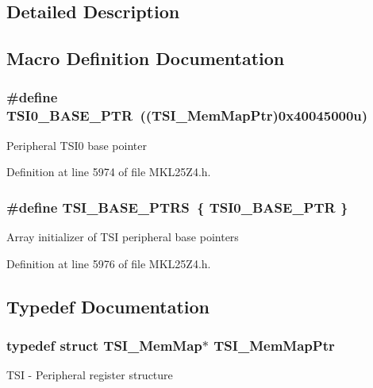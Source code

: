 \subsection{Detailed Description}


\subsection{Macro Definition Documentation}
\subsubsection[{\texorpdfstring{T\+S\+I0\+\_\+\+B\+A\+S\+E\+\_\+\+P\+TR}{TSI0_BASE_PTR}}]{\setlength{\rightskip}{0pt plus 5cm}\#define T\+S\+I0\+\_\+\+B\+A\+S\+E\+\_\+\+P\+TR~(({\bf T\+S\+I\+\_\+\+Mem\+Map\+Ptr})0x40045000u)}\hypertarget{group___t_s_i___peripheral_gaf98ea1cd15559446e0cfc1ae177751f6}{}\label{group___t_s_i___peripheral_gaf98ea1cd15559446e0cfc1ae177751f6}
Peripheral T\+S\+I0 base pointer 

Definition at line 5974 of file M\+K\+L25\+Z4.\+h.

\subsubsection[{\texorpdfstring{T\+S\+I\+\_\+\+B\+A\+S\+E\+\_\+\+P\+T\+RS}{TSI_BASE_PTRS}}]{\setlength{\rightskip}{0pt plus 5cm}\#define T\+S\+I\+\_\+\+B\+A\+S\+E\+\_\+\+P\+T\+RS~\{ {\bf T\+S\+I0\+\_\+\+B\+A\+S\+E\+\_\+\+P\+TR} \}}\hypertarget{group___t_s_i___peripheral_gaf0e643a8dc882d5a89dd6bb9a4ca3d16}{}\label{group___t_s_i___peripheral_gaf0e643a8dc882d5a89dd6bb9a4ca3d16}
Array initializer of T\+SI peripheral base pointers 

Definition at line 5976 of file M\+K\+L25\+Z4.\+h.



\subsection{Typedef Documentation}
\subsubsection[{\texorpdfstring{T\+S\+I\+\_\+\+Mem\+Map\+Ptr}{TSI_MemMapPtr}}]{\setlength{\rightskip}{0pt plus 5cm}typedef struct {\bf T\+S\+I\+\_\+\+Mem\+Map}$\ast$ {\bf T\+S\+I\+\_\+\+Mem\+Map\+Ptr}}\hypertarget{group___t_s_i___peripheral_gad1310fedc6b594554cdd760e371de570}{}\label{group___t_s_i___peripheral_gad1310fedc6b594554cdd760e371de570}
T\+SI -\/ Peripheral register structure 